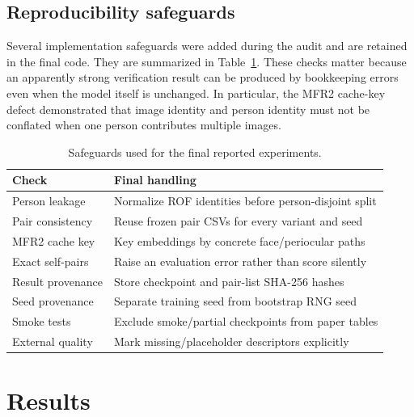 ﻿\documentclass[10pt,journal,compsoc]{IEEEtran}
\begin{document}
\subsection{Reproducibility safeguards}
Several implementation safeguards were added during the audit and are retained in the final code. They are summarized in Table~\ref{tab:safeguards}. These checks matter because an apparently strong verification result can be produced by bookkeeping errors even when the model itself is unchanged. In particular, the MFR2 cache-key defect demonstrated that image identity and person identity must not be conflated when one person contributes multiple images.

\begin{table}[t]
\centering
\caption{Safeguards used for the final reported experiments.}
\label{tab:safeguards}
\begin{tabular}{p{}p{}}
\toprule
Check & Final handling\\
\midrule
Person leakage & Normalize ROF identities before person-disjoint split\\
Pair consistency & Reuse frozen pair CSVs for every variant and seed\\
MFR2 cache key & Key embeddings by concrete face/periocular paths\\
Exact self-pairs & Raise an evaluation error rather than score silently\\
Result provenance & Store checkpoint and pair-list SHA-256 hashes\\
Seed provenance & Separate training seed from bootstrap RNG seed\\
Smoke tests & Exclude smoke/partial checkpoints from paper tables\\
External quality & Mark missing/placeholder descriptors explicitly\\
\bottomrule
\end{tabular}
\end{table}

\section{Results}
\end{document}
